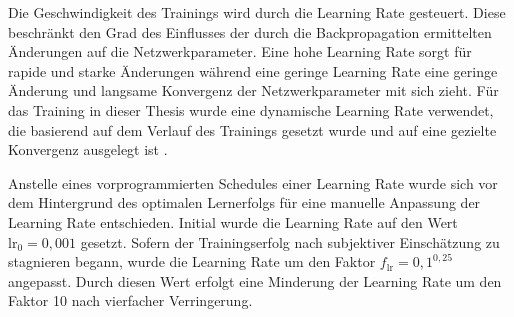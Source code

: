 Die Geschwindigkeit des Trainings wird durch die Learning Rate gesteuert. Diese beschränkt den Grad des Einflusses der durch die Backpropagation ermittelten Änderungen auf die Netzwerkparameter. Eine hohe Learning Rate sorgt für rapide und starke Änderungen während eine geringe Learning Rate eine geringe Änderung und langsame Konvergenz der Netzwerkparameter mit sich zieht. Für das Training in dieser Thesis wurde eine dynamische Learning Rate verwendet, die basierend auf dem Verlauf des Trainings gesetzt wurde und auf eine gezielte Konvergenz ausgelegt ist \cite{adaptive_lr_schedule}.

Anstelle eines vorprogrammierten Schedules einer Learning Rate wurde sich vor dem Hintergrund des optimalen Lernerfolgs für eine manuelle Anpassung der Learning Rate entschieden. Initial wurde die Learning Rate auf den Wert $\text{lr}_0 = 0,\!001$ gesetzt. Sofern der Trainingserfolg nach subjektiver Einschätzung zu stagnieren begann, wurde die Learning Rate um den Faktor $f_\text{lr} = 0,\!1^{0,25}$ angepasst. Durch diesen Wert erfolgt eine Minderung der Learning Rate um den Faktor 10 nach vierfacher Verringerung.



